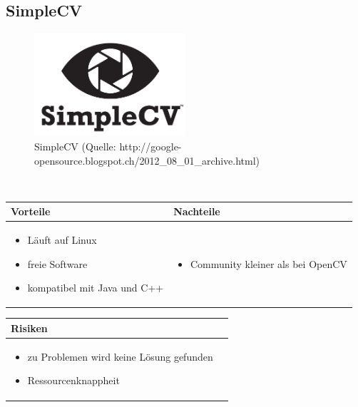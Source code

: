 \pagebreak


\subsection{SimpleCV}
\begin{figure}[h!]%
\centering
\includegraphics[width=0.5\textwidth]{fig/simplecv.png}
\caption{SimpleCV (Quelle: http://google-opensource.blogspot.ch/2012_08_01_archive.html)}
\label{fig:OpenCV}
\end{figure}
\\
\begin{table}[h]
\begin{tabular}{p{} | p{}}


 \textbf{Vorteile} & \textbf{Nachteile} \\ \hline
	 
\begin{itemize}
\item Läuft auf Linux
\item freie Software
\item kompatibel mit Java und C++
\end{itemize}

 &
 
\begin{itemize}
\item Community kleiner als bei OpenCV
\end{itemize}

\end{tabular}
\end{table}

\begin{table}[h]
\begin{tabular}{p{}p{}}


\textbf{Risiken} & \\ \hline
	 
\begin{itemize}
\item zu Problemen wird keine Lösung gefunden
\item Ressourcenknappheit
\end{itemize}
 
\end{tabular}
\end{table}

\pagebreak